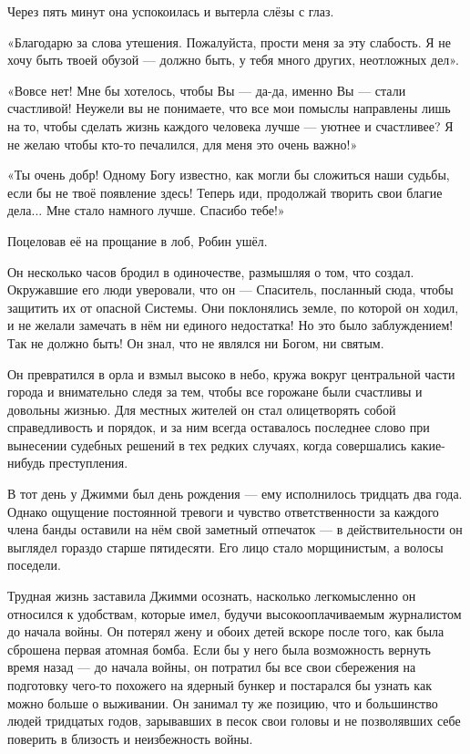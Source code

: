 \documentclass[a5paper, 9pt,
final, openany, twoside=true]{memoir}
\begin{document}
Через пять минут она успокоилась и вытерла слёзы с глаз.

«Благодарю за слова утешения. Пожалуйста, прости меня за эту слабость. Я не хочу быть твоей обузой — должно быть, у тебя много других, неотложных дел».

«Вовсе нет! Мне бы хотелось, чтобы Вы — да-да, именно Вы — стали счастливой! Неужели вы не понимаете, что все мои помыслы направлены лишь на то, чтобы сделать жизнь каждого человека лучше — уютнее и счастливее? Я не желаю чтобы кто-то печалился, для меня это очень важно!»

«Ты очень добр! Одному Богу известно, как могли бы сложиться наши судьбы, если бы не твоё появление здесь! Теперь иди, продолжай творить свои благие дела... Мне стало намного лучше. Спасибо тебе!»

Поцеловав её на прощание в лоб, Робин ушёл.

Он несколько часов бродил в одиночестве, размышляя о том, что создал. Окружавшие его люди уверовали, что он — Спаситель, посланный сюда, чтобы защитить их от опасной Системы. Они поклонялись земле, по которой он ходил, и не желали замечать в нём ни единого недостатка! Но это было заблуждением! Так не должно быть! Он знал, что не являлся ни Богом, ни святым.\bigskip

Он превратился в орла и взмыл высоко в небо, кружа вокруг центральной части города и внимательно следя за тем, чтобы все горожане были счастливы и довольны жизнью. Для местных жителей он стал олицетворять собой справедливость и порядок, и за ним всегда оставалось последнее слово при вынесении судебных решений в тех редких случаях, когда совершались какие-нибудь преступления.\bigskip

В тот день у Джимми был день рождения — ему исполнилось тридцать два года. Однако ощущение постоянной тревоги и чувство ответственности за каждого члена банды оставили на нём свой заметный отпечаток — в действительности он выглядел гораздо старше пятидесяти. Его лицо стало морщинистым, а волосы поседели.

Трудная жизнь заставила Джимми осознать, насколько легкомысленно он относился к удобствам, которые имел, будучи высокооплачиваемым журналистом до начала войны. Он потерял жену и обоих детей вскоре после того, как была сброшена первая атомная бомба. Если бы у него была возможность вернуть время назад — до начала войны, он потратил бы все свои сбережения на подготовку чего-то похожего на ядерный бункер и постарался бы узнать как можно больше о выживании. Он занимал ту же позицию, что и большинство людей тридцатых годов, зарывавших в песок свои головы и не позволявших себе поверить в близость и неизбежность войны.
\end{document}
